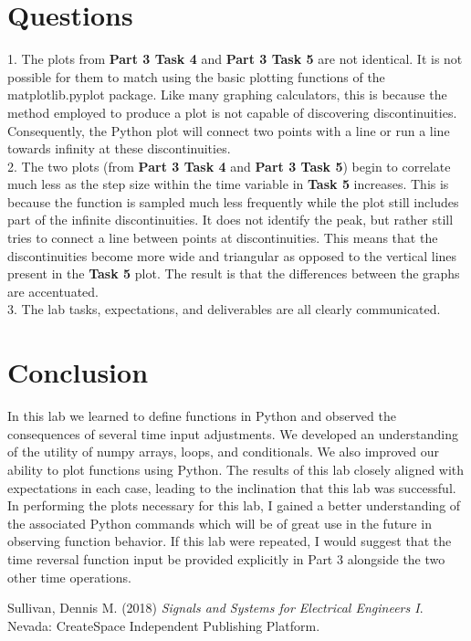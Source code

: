 \documentclass[12pt]{report}
\begin{document}
\section{Questions}

1. The plots from \textbf{Part 3 Task 4} and \textbf{Part 3 Task 5} are not identical. It is not possible for them to match using the basic plotting functions of the matplotlib.pyplot package. Like many graphing calculators, this is because the method employed to produce a plot is not capable of discovering discontinuities. Consequently, the Python plot will connect two points with a line or run a line towards infinity at these discontinuities. \\

2. The two plots (from \textbf{Part 3 Task 4} and \textbf{Part 3 Task 5}) begin to correlate much less as the step size within the time variable in \textbf{Task 5} increases. This is because the function is sampled much less frequently while the plot still includes part of the infinite discontinuities. It does not identify the peak, but rather still tries to connect a line between points at discontinuities. This means that the discontinuities become more wide and triangular as opposed to the vertical lines present in the \textbf{Task 5} plot. The result is that the differences between the graphs are accentuated. \\

3. The lab tasks, expectations, and deliverables are all clearly communicated. \\

\section{Conclusion}

In this lab we learned to define functions in Python and observed the consequences of several time input adjustments. We developed an understanding of the utility of numpy arrays, loops, and conditionals. We also improved our ability to plot functions using Python. The results of this lab closely aligned with expectations in each case, leading to the inclination that this lab was successful. In performing the plots necessary for this lab, I gained a better understanding of the associated Python commands which will be of great use in the future in observing function behavior. If this lab were repeated, I would suggest that the time reversal function input be provided explicitly in Part 3 alongside the two other time operations.

\newpage
\begin{thebibliography}{111}

Sullivan, Dennis M. (2018) {\it  Signals and Systems for Electrical Engineers I}. Nevada: CreateSpace Independent Publishing Platform.


\end{thebibliography}
\end{document}
